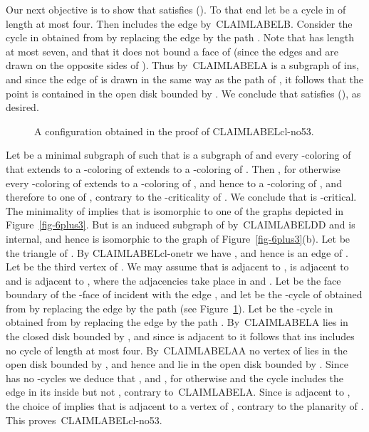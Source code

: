 \documentclass{article}
\def\refclaim#1{\csname CLAIMLABEL#1\endcsname}
\def\endclaim{\medskip}
\def\rt#1{#1}
\begin{document}
Our next objective is to show that  satisfies ().
To that end let  be a cycle in  of length at most four.
Then  includes the edge  by~\refclaim{B}.
Consider the cycle  in  obtained from  by replacing the edge
 by the path .
Note that  has length at most seven, and that it does not bound a face 
\rt{of }
(since the edges  and  are drawn on the opposite sides of ).
Thus by~\refclaim{A}  is a subgraph of ins, and since the edge  of 
is drawn in the same way as the path  of , it follows that the point 
is contained in the open disk bounded by .
We conclude that  satisfies (), as desired.

\begin{figure}
\begin{center}
\end{center}
\caption{A configuration obtained in the proof of \refclaim{cl-no53}.}
\label{fig-12}
\end{figure}

Let  be a minimal subgraph of  such that  is a subgraph
of  and 
every -coloring of  that extends to a -coloring of  extends
to a -coloring of .  
Then , for otherwise every -coloring of  extends to
a -coloring of , and hence to a -coloring of , 
and therefore to one of , contrary to the -criticality of .
We conclude that  is -critical.
The minimality of  implies that  is isomorphic to one of the
graphs depicted in Figure~\ref{fig-6plus3}.
But  is an induced subgraph of  by~\refclaim{DD} 
and  is internal, and hence 
is isomorphic to the graph of Figure~\ref{fig-6plus3}(b).
Let  be the triangle of . 
By \refclaim{cl-onetr} we have , 
and hence  is an edge of .
Let  be the third vertex of .
We may assume that  is adjacent to ,  is adjacent to 
and  is adjacent to , where the adjacencies take place in
 and .
Let  be the face boundary of the -face of  incident with the edge 
, and let  be the -cycle of  obtained
from  by replacing the edge  by the path  (see Figure~\ref{fig-12}).  
Let  be the -cycle in  obtained from  by
replacing the edge  by the path .  
By~\refclaim{A}  lies in the closed disk bounded by , and 
since  is adjacent to  it follows that
ins includes no cycle of length at most four.  
By~\refclaim{AA}
no vertex of  lies in the open disk bounded by , 
and hence  and  lie in the open disk bounded by .
Since  has no -cycles we deduce that ,
and , for otherwise  and the cycle
 includes the edge  in its inside but not ,
contrary to~\refclaim{A}.
Since  is adjacent to , the choice of  implies that
 is adjacent to a vertex of , contrary to the planarity of .
This proves~\refclaim{cl-no53}.
\endclaim
\end{document}
